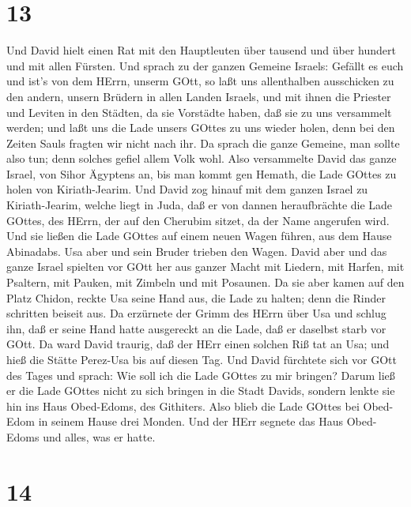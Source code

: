 \hypertarget{section-12}{%
\section{13}\label{section-12}}

 Und David hielt einen Rat mit den Hauptleuten über tausend
und über hundert und mit allen Fürsten.  Und sprach zu der
ganzen Gemeine Israels: Gefällt es euch und ist's von dem HErrn, unserm
GOtt, so laßt uns allenthalben ausschicken zu den andern, unsern Brüdern
in allen Landen Israels, und mit ihnen die Priester und Leviten in den
Städten, da sie Vorstädte haben, daß sie zu uns versammelt werden;
 und laßt uns die Lade unsers GOttes zu uns wieder holen,
denn bei den Zeiten Sauls fragten wir nicht nach ihr.  Da
sprach die ganze Gemeine, man sollte also tun; denn solches gefiel allem
Volk wohl.  Also versammelte David das ganze Israel, von
Sihor Ägyptens an, bis man kommt gen Hemath, die Lade GOttes zu holen
von Kiriath-Jearim.  Und David zog hinauf mit dem ganzen
Israel zu Kiriath-Jearim, welche liegt in Juda, daß er von dannen
heraufbrächte die Lade GOttes, des HErrn, der auf den Cherubim sitzet,
da der Name angerufen wird.  Und sie ließen die Lade GOttes
auf einem neuen Wagen führen, aus dem Hause Abinadabs. Usa aber und sein
Bruder trieben den Wagen.  David aber und das ganze Israel
spielten vor GOtt her aus ganzer Macht mit Liedern, mit Harfen, mit
Psaltern, mit Pauken, mit Zimbeln und mit Posaunen.  Da sie
aber kamen auf den Platz Chidon, reckte Usa seine Hand aus, die Lade zu
halten; denn die Rinder schritten beiseit aus.  Da
erzürnete der Grimm des HErrn über Usa und schlug ihn, daß er seine Hand
hatte ausgereckt an die Lade, daß er daselbst starb vor GOtt.
 Da ward David traurig, daß der HErr einen solchen Riß tat
an Usa; und hieß die Stätte Perez-Usa bis auf diesen Tag. 
Und David fürchtete sich vor GOtt des Tages und sprach: Wie soll ich die
Lade GOttes zu mir bringen?  Darum ließ er die Lade GOttes
nicht zu sich bringen in die Stadt Davids, sondern lenkte sie hin ins
Haus Obed-Edoms, des Githiters.  Also blieb die Lade GOttes
bei Obed-Edom in seinem Hause drei Monden. Und der HErr segnete das Haus
Obed-Edoms und alles, was er hatte.

\hypertarget{section-13}{%
\section{14}\label{section-13}}

